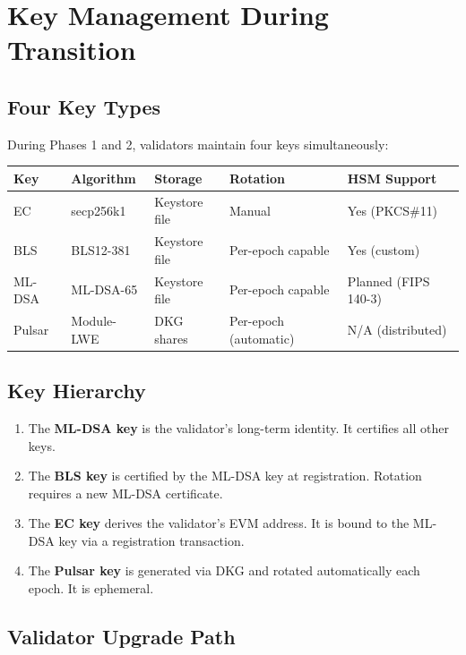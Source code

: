 \section{Key Management During Transition}


\subsection{Four Key Types}

During Phases 1 and 2, validators maintain four keys simultaneously:

\begin{center}
\begin{tabular}{lllll}
\toprule
\textbf{Key} & \textbf{Algorithm} & \textbf{Storage} & \textbf{Rotation} & \textbf{HSM Support} \\
\midrule
EC & secp256k1 & Keystore file & Manual & Yes (PKCS\#11) \\
BLS & BLS12-381 & Keystore file & Per-epoch capable & Yes (custom) \\
ML-DSA & ML-DSA-65 & Keystore file & Per-epoch capable & Planned (FIPS 140-3) \\
Pulsar & Module-LWE & DKG shares & Per-epoch (automatic) & N/A (distributed) \\
\bottomrule
\end{tabular}
\end{center}

\subsection{Key Hierarchy}

\begin{enumerate}[leftmargin=2em]
\item The \textbf{ML-DSA key} is the validator's long-term identity. It certifies all other keys.
\item The \textbf{BLS key} is certified by the ML-DSA key at registration. Rotation requires a new ML-DSA certificate.
\item The \textbf{EC key} derives the validator's EVM address. It is bound to the ML-DSA key via a registration transaction.
\item The \textbf{Pulsar key} is generated via DKG and rotated automatically each epoch. It is ephemeral.
\end{enumerate}

\subsection{Validator Upgrade Path}

